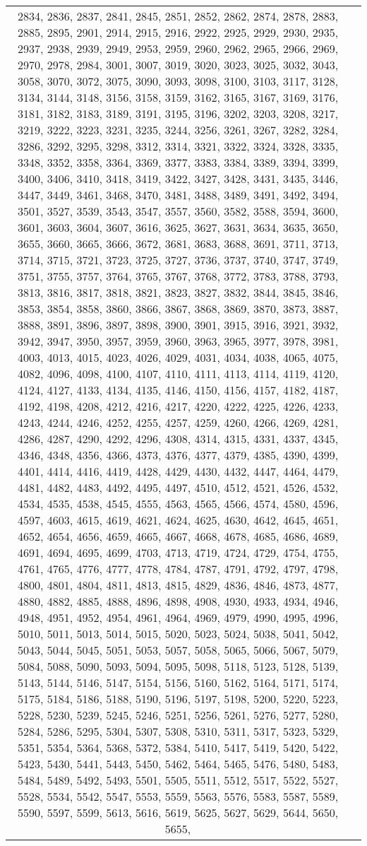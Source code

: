 \documentclass[12pt]{article}
\begin{document}
\begin{tabular}{|c|p{17cm}|}
2834, 2836, 2837, 2841, 2845, 2851, 2852, 2862, 2874, 2878, 2883, 2885, 2895, 2901, 2914, 2915, 2916, 2922, 2925, 2929, 2930, 2935, 2937, 2938, 2939, 2949, 2953, 2959, 2960, 2962, 2965, 2966, 2969, 2970, 2978, 2984, 3001, 3007, 3019, 3020, 3023, 3025, 3032, 3043, 3058, 3070, 3072, 3075, 3090, 3093, 3098, 3100, 3103, 3117, 3128, 3134, 3144, 3148, 3156, 3158, 3159, 3162, 3165, 3167, 3169, 3176, 3181, 3182, 3183, 3189, 3191, 3195, 3196, 3202, 3203, 3208, 3217, 3219, 3222, 3223, 3231, 3235, 3244, 3256, 3261, 3267, 3282, 3284, 3286, 3292, 3295, 3298, 3312, 3314, 3321, 3322, 3324, 3328, 3335, 3348, 3352, 3358, 3364, 3369, 3377, 3383, 3384, 3389, 3394, 3399, 3400, 3406, 3410, 3418, 3419, 3422, 3427, 3428, 3431, 3435, 3446, 3447, 3449, 3461, 3468, 3470, 3481, 3488, 3489, 3491, 3492, 3494, 3501, 3527, 3539, 3543, 3547, 3557, 3560, 3582, 3588, 3594, 3600, 3601, 3603, 3604, 3607, 3616, 3625, 3627, 3631, 3634, 3635, 3650, 3655, 3660, 3665, 3666, 3672, 3681, 3683, 3688, 3691, 3711, 3713, 3714, 3715, 3721, 3723, 3725, 3727, 3736, 3737, 3740, 3747, 3749, 3751, 3755, 3757, 3764, 3765, 3767, 3768, 3772, 3783, 3788, 3793, 3813, 3816, 3817, 3818, 3821, 3823, 3827, 3832, 3844, 3845, 3846, 3853, 3854, 3858, 3860, 3866, 3867, 3868, 3869, 3870, 3873, 3887, 3888, 3891, 3896, 3897, 3898, 3900, 3901, 3915, 3916, 3921, 3932, 3942, 3947, 3950, 3957, 3959, 3960, 3963, 3965, 3977, 3978, 3981, 4003, 4013, 4015, 4023, 4026, 4029, 4031, 4034, 4038, 4065, 4075, 4082, 4096, 4098, 4100, 4107, 4110, 4111, 4113, 4114, 4119, 4120, 4124, 4127, 4133, 4134, 4135, 4146, 4150, 4156, 4157, 4182, 4187, 4192, 4198, 4208, 4212, 4216, 4217, 4220, 4222, 4225, 4226, 4233, 4243, 4244, 4246, 4252, 4255, 4257, 4259, 4260, 4266, 4269, 4281, 4286, 4287, 4290, 4292, 4296, 4308, 4314, 4315, 4331, 4337, 4345, 4346, 4348, 4356, 4366, 4373, 4376, 4377, 4379, 4385, 4390, 4399, 4401, 4414, 4416, 4419, 4428, 4429, 4430, 4432, 4447, 4464, 4479, 4481, 4482, 4483, 4492, 4495, 4497, 4510, 4512, 4521, 4526, 4532, 4534, 4535, 4538, 4545, 4555, 4563, 4565, 4566, 4574, 4580, 4596, 4597, 4603, 4615, 4619, 4621, 4624, 4625, 4630, 4642, 4645, 4651, 4652, 4654, 4656, 4659, 4665, 4667, 4668, 4678, 4685, 4686, 4689, 4691, 4694, 4695, 4699, 4703, 4713, 4719, 4724, 4729, 4754, 4755, 4761, 4765, 4776, 4777, 4778, 4784, 4787, 4791, 4792, 4797, 4798, 4800, 4801, 4804, 4811, 4813, 4815, 4829, 4836, 4846, 4873, 4877, 4880, 4882, 4885, 4888, 4896, 4898, 4908, 4930, 4933, 4934, 4946, 4948, 4951, 4952, 4954, 4961, 4964, 4969, 4979, 4990, 4995, 4996, 5010, 5011, 5013, 5014, 5015, 5020, 5023, 5024, 5038, 5041, 5042, 5043, 5044, 5045, 5051, 5053, 5057, 5058, 5065, 5066, 5067, 5079, 5084, 5088, 5090, 5093, 5094, 5095, 5098, 5118, 5123, 5128, 5139, 5143, 5144, 5146, 5147, 5154, 5156, 5160, 5162, 5164, 5171, 5174, 5175, 5184, 5186, 5188, 5190, 5196, 5197, 5198, 5200, 5220, 5223, 5228, 5230, 5239, 5245, 5246, 5251, 5256, 5261, 5276, 5277, 5280, 5284, 5286, 5295, 5304, 5307, 5308, 5310, 5311, 5317, 5323, 5329, 5351, 5354, 5364, 5368, 5372, 5384, 5410, 5417, 5419, 5420, 5422, 5423, 5430, 5441, 5443, 5450, 5462, 5464, 5465, 5476, 5480, 5483, 5484, 5489, 5492, 5493, 5501, 5505, 5511, 5512, 5517, 5522, 5527, 5528, 5534, 5542, 5547, 5553, 5559, 5563, 5576, 5583, 5587, 5589, 5590, 5597, 5599, 5613, 5616, 5619, 5625, 5627, 5629, 5644, 5650, 5655, 
\end{tabular}
\end{document}
